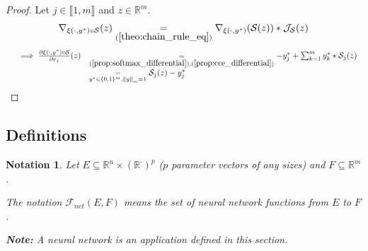 \documentclass[11pt,en]{elegantpaper}
\newtheorem{notation}{Notation}
\newcommand{\norm}[1]{\left\lVert#1\right\rVert}
\newcommand{\Real}{\mathbb{R}}
\begin{document}
\begin{proof}
  Let $j \in \llbracket 1,m \rrbracket$ and $z \in \Real^m$. \begin{equation*}
    \begin{gathered}
      \nabla_{\xi(\cdot,y^*) \circ \mathcal{S}}(z) \underset{(\ref{theo:chain_rule_eq})}{=} \nabla_{\xi(\cdot,y^*)}(\mathcal{S}(z)) * \mathcal{J}_{\mathcal{S}}(z)
    \end{gathered}
  \end{equation*}
  \begin{equation*}
    \begin{array}{lll}
      & \implies \frac{\partial \xi(\cdot,y^*) \circ \mathcal{S}}{\partial e_j} (z)
        & \underset{(\ref{prop:softmax_differential}),(\ref{prop:cce_differential})}= - y_j^* + \sum_{k=1}^m {y_k^* * \mathcal{S}_j(z)} \\
      & & \underset{y^* \in \{0,1\}^m, \norm{y}_m = 1}{=} \mathcal{S}_j(z) - y_j^*
    \end{array}
  \end{equation*}
\end{proof}

\subsection{Definitions}

\begin{notation}
  Let $E \subseteq \Real^n \times (\Real^{\cdot})^p$ ($p$ parameter vectors of any sizes) and $F \subseteq \Real^m$. \par
  The notation $\mathcal{F}_{net}(E,F)$ means the set of neural network functions from $E$ to $F$. \par
  \textbf{Note:} A neural network is an application defined in this section. \par
\end{notation}
\end{document}
